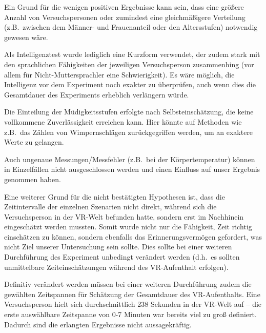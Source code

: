 \documentclass{Paper}
\begin{document}
Ein Grund für die wenigen positiven Ergebnisse kann sein, dass eine größere Anzahl von Versuchspersonen oder zumindest eine gleichmäßigere Verteilung (z.B.\ zwischen dem Männer- und Frauenanteil oder den Altersstufen) notwendig gewesen wäre.

Als Intelligenztest wurde lediglich eine Kurzform verwendet, der zudem stark mit den sprachlichen Fähigkeiten der jeweiligen Versuchsperson zusammenhing (vor allem für Nicht-Muttersprachler eine Schwierigkeit). Es wäre möglich, die Intelligenz vor dem Experiment noch exakter zu überprüfen, auch wenn dies die Gesamtdauer des Experiments erheblich verlängern würde.

Die Einteilung der Müdigkeitsstufen erfolgte nach Selbsteinschätzung, die keine vollkommene Zuverlässigkeit erreichen kann. Hier könnte auf Methoden wie z.B.\ das Zählen von Wimpernschlägen zurückgegriffen werden, um an exaktere Werte zu gelangen.

Auch ungenaue Messungen/Messfehler (z.B.\ bei der Körpertemperatur) können in Einzelfällen nicht ausgeschlossen werden und einen Einfluss auf unser Ergebnis genommen haben.

Eine weiterer Grund für die nicht bestätigten Hypothesen ist, dass die Zeitintervalle der einzelnen Szenarien nicht direkt, während sich die Versuchsperson in der VR-Welt befunden hatte, sondern erst im Nachhinein eingeschätzt werden mussten.
Somit wurde nicht nur die Fähigkeit, Zeit richtig einschätzen zu können, sondern
ebenfalls das Erinnerungsvermögen gefordert, was nicht Ziel unserer Untersuchung sein sollte. Dies sollte bei einer weiteren Durchführung des Experiment unbedingt verändert werden (d.h.\ es sollten unmittelbare Zeiteinschätzungen während des VR-Aufenthalt erfolgen).

Definitiv verändert werden müssen bei einer weiteren Durchführung zudem die gewählten Zeitspannen für Schätzung der Gesamtdauer des VR-Aufenthalts. Eine Versuchsperson hielt sich durchschnittlich 238 Sekunden in der VR-Welt auf -- die erste auswählbare Zeitspanne von 0-7 Minuten war bereits viel zu groß definiert. Dadurch sind die erlangten Ergebnisse nicht aussagekräftig.


\newpage




\end{document}
